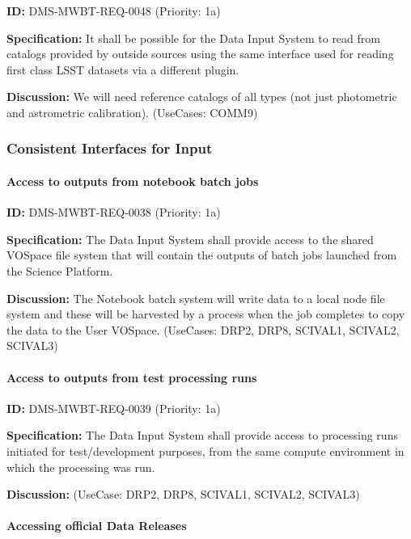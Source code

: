 \documentclass[SE,toc,lsstdraft]{lsstdoc}
\begin{document}
\label{DMS-MWBT-REQ-0048}
\textbf{ID:} DMS-MWBT-REQ-0048 (Priority: 1a)

\textbf{Specification:}
It shall be possible for the Data Input System to read from catalogs provided by outside sources using the same interface used for reading first class LSST datasets via a different plugin.

\textbf{Discussion:}
We will need reference catalogs of all types (not just photometric and astrometric calibration). (UseCases: COMM9)

\subsubsection{Consistent Interfaces for Input}

\paragraph{Access to outputs from notebook batch jobs}\hfill  %

\label{DMS-MWBT-REQ-0038}
\textbf{ID:} DMS-MWBT-REQ-0038 (Priority: 1a)

\textbf{Specification:}
The Data Input System shall provide access to the shared VOSpace file system that will contain the outputs of batch jobs launched from the Science Platform.

\textbf{Discussion:}
The Notebook batch system will write data to a local node file system and these will be harvested by a process when the job completes to copy the data to the User VOSpace. (UseCases: DRP2, DRP8, SCIVAL1, SCIVAL2, SCIVAL3)

\paragraph{Access to outputs from test processing runs}\hfill  %

\label{DMS-MWBT-REQ-0039}
\textbf{ID:} DMS-MWBT-REQ-0039 (Priority: 1a)

\textbf{Specification:}
The Data Input System shall provide access to processing runs initiated for test/development purposes, from the same compute environment in which the processing was run.

\textbf{Discussion:}
(UseCase: DRP2, DRP8, SCIVAL1, SCIVAL2, SCIVAL3)

\paragraph{Accessing official Data Releases}\hfill  %
\end{document}
